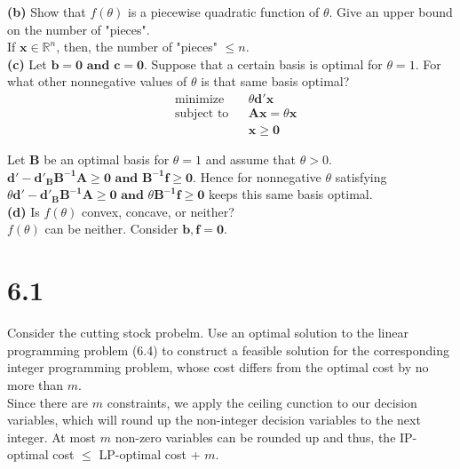\documentclass{article}
\begin{document}
\noindent
\textbf{(b)}  Show that $f(\theta)$ is a piecewise quadratic function of $\theta$.  Give an upper bound on the number of "pieces". \\

\noindent
If $\mathbf{x} \in \mathbb{R}^n$, then, the number of "pieces" $\leq n$. \\


\noindent
\textbf{(c)}  Let $\mathbf{b = 0 \text{ and } c = 0}$.  Suppose that a certain basis is optimal for $\theta = 1$.  For what other nonnegative values of $\theta$ is that same basis optimal? \\

\noindent
\begin{equation*}
\begin{aligned}
& \text{minimize} && \theta\mathbf{d'x} \\
& \text{subject to} && \mathbf{Ax = } \theta \mathbf{x} \\
& && \mathbf{x \geq 0}
\end{aligned}
\end{equation*}

\noindent
Let $\mathbf{B}$ be an optimal basis for $\theta = 1$ and assume that $\theta > 0$.  $\mathbf{d' - d'_B B^{-1} A \geq 0 \text{ and } B^{-1}f \geq 0}$.  Hence for nonnegative $\theta$ satisfying $\theta \mathbf{d' - d'_B B^{-1} A \geq 0 \text{ and } } \theta \mathbf{B^{-1}f \geq 0}$ keeps this same basis optimal. \\

\noindent
\textbf{(d)} Is $f(\theta)$ convex, concave, or neither? \\

\noindent
$f(\theta)$ can be neither.  Consider $\mathbf{b, f = 0}$. \\

\section*{6.1}
Consider the cutting stock probelm.  Use an optimal solution to the linear programming problem (6.4) to construct a feasible solution for the corresponding integer programming problem, whose cost differs from the optimal cost by no more than $m$.  \\

\noindent
Since there are $m$ constraints, we apply the ceiling cunction to our decision variables, which will round up the non-integer decision variables to the next integer.  At most $m$ non-zero variables can be rounded up and thus, the IP-optimal cost $\leq$ LP-optimal cost + $m$. \\
\end{document}
